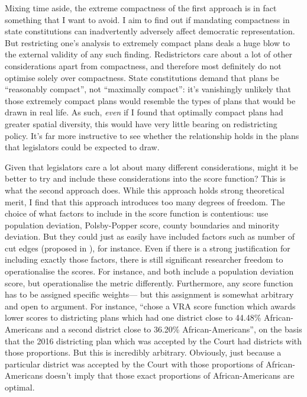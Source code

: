 \documentclass[]{article}
\begin{document}
Mixing time aside, the extreme compactness of the first approach is in
fact something that I want to avoid. I aim to find out if mandating
compactness in state constitutions can inadvertently adversely affect
democratic representation. But restricting one's analysis to extremely
compact plans deals a huge blow to the external validity of any such
finding. Redistrictors care about a lot of other considerations apart
from compactness, and therefore most definitely do not optimise solely
over compactness. State constitutions demand that plans be ``reasonably
compact'', not ``maximally compact'': it's vanishingly unlikely that
those extremely compact plans would resemble the types of plans that
would be drawn in real life. As such, \emph{even} if I found that
optimally compact plans had greater spatial diversity, this would have
very little bearing on redistricting policy. It's far more instructive
to see whether the relationship holds in the plans that legislators
could be expected to draw.

Given that legislators care a lot about many different considerations,
might it be better to try and include these considerations into the
score function? This is what the second approach does. While this
approach holds strong theoretical merit, I find that this approach
introduces too many degrees of freedom. The choice of what factors to
include in the score function is contentious: \citeauthor{h2018} use
population deviation, Polsby-Popper score, county boundaries and
minority deviation. But they could just as easily have included factors
such as number of cut edges (proposed in \cite{dc2016}), for instance.
Even if there is a strong justification for including exactly those
factors, there is still significant researcher freedom to operationalise
the scores. For instance, \citeauthor{h2018} and \citeauthor{dd2019va}
both include a population deviation score, but operationalise the metric
differently. Furthermore, any score function has to be assigned specific
weights--- but this assignment is somewhat arbitrary and open to
argument. For instance, \citeauthor{h2018} ``chose a VRA score function
which awards lower scores to districting plans which had one district
close to 44.48\% African-Americans and a second district close to
36.20\% African-Americans'', on the basis that the 2016 districting plan
which was accepted by the Court had districts with those proportions.
But this is incredibly arbitrary. Obviously, just because a particular
district was accepted by the Court with those proportions of
African-Americans doesn't imply that those exact proportions of
African-Americans are optimal.
\end{document}
